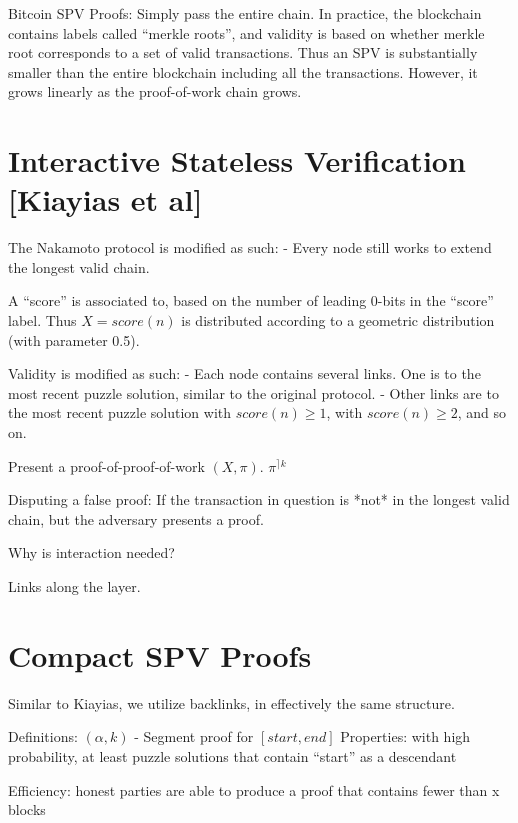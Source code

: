 \documentclass[11pt]{llncs}
\begin{document}
Bitcoin SPV Proofs:
	Simply pass the entire chain.
	In practice, the blockchain contains labels called “merkle roots”, and validity is based on whether merkle root corresponds to a set of valid transactions. Thus an SPV is substantially smaller than the entire blockchain including all the transactions. However, it grows linearly as the proof-of-work chain grows.




\section{Interactive Stateless Verification [Kiayias et al]}


	The Nakamoto protocol is modified as such:
	- Every node still works to extend the longest valid chain.


	A “score” is associated to, based on the number of leading 0-bits in the
    “score” label. Thus $X = score(n)$ is distributed according to a geometric distribution (with parameter 0.5).


	Validity is modified as such:
	- Each node contains several links. One is to the most recent puzzle solution, similar to the original protocol.
	- Other links are to the most recent puzzle solution with $score(n) \geq
    1$,  with $score(n) \geq 2$, and so on.




	Present a proof-of-proof-of-work   $(X, \pi)$.    $\pi^{\rceil k}$




	Disputing a false proof:
		If the transaction in question is *not* in the longest valid chain, but the adversary presents a proof.


	Why is interaction needed?


	Links along the layer.




\section{Compact SPV Proofs}


	Similar to Kiayias, we utilize backlinks, in effectively the same structure.




	Definitions:
$(\alpha, k)$ - Segment proof for $[start, end]$
Properties:
with high probability, at least puzzle solutions that contain “start” as a descendant


Efficiency:
	honest parties are able to produce a proof that contains fewer than x blocks
\end{document}
